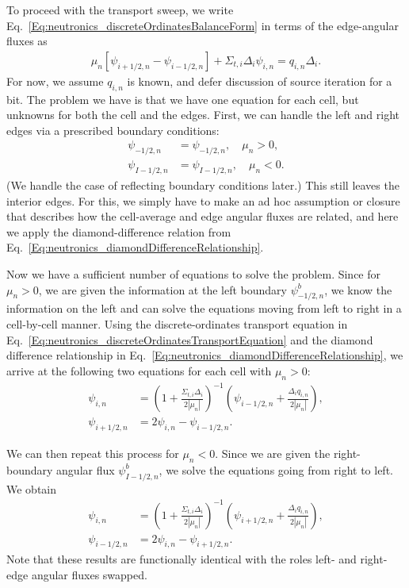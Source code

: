 To proceed with the transport sweep, we write Eq.~\eqref{Eq:neutronics_discreteOrdinatesBalanceForm} in terms of the edge-angular fluxes as
\begin{align}
  \mu_n \left[ \psi_{i+1/2,n} - \psi_{i-1/2,n} \right] + \Sigma_{t,i} \Delta_i \psi_{i,n} = q_{i,n} \Delta_i . \label{Eq:neutronics_discreteOrdinatesTransportEquation}
\end{align}
For now, we assume $q_{i,n}$ is known, and defer discussion of source iteration for a bit. The problem we have is that we have one equation for each cell, but unknowns for both the cell and the edges. First, we can handle the left and right edges via a prescribed boundary conditions:
\begin{subequations}
\begin{align}
  \psi_{-1/2,n}  &= \psi_{-1/2,n},  \quad \mu_n > 0, \\
  \psi_{I-1/2,n} &= \psi_{I-1/2,n}, \quad \mu_n < 0.  
\end{align}
\end{subequations}
(We handle the case of reflecting boundary conditions later.) This still leaves the interior edges. For this, we simply have to make an ad hoc assumption or closure that describes how the cell-average and edge angular fluxes are related, and here we apply the diamond-difference relation from Eq.~\eqref{Eq:neutronics_diamondDifferenceRelationship}.

Now we have a sufficient number of equations to solve the problem. Since for $\mu_n > 0$, we are given the information at the left boundary $\psi_{-1/2,n}^b$, we know the information on the left and can solve the equations moving from left to right in a cell-by-cell manner. Using the discrete-ordinates transport equation in Eq.~\eqref{Eq:neutronics_discreteOrdinatesTransportEquation} and the diamond difference relationship in Eq.~\eqref{Eq:neutronics_diamondDifferenceRelationship}, we arrive at the following two equations for each cell with $\mu_n > 0$:
\begin{subequations}
\begin{align}
  \psi_{i,n} &= \left( 1 + \frac{\Sigma_{t,i} \Delta_i}{ 2 | \mu_n | } \right)^{-1} \left( \psi_{i-1/2,n} + \frac{ \Delta_i q_{i,n} }{ 2 | \mu_n | } \right) , \\
  \psi_{i+1/2,n} &= 2 \psi_{i,n} - \psi_{i-1/2,n} .
\end{align}
\end{subequations}

We can then repeat this process for $\mu_n < 0$. Since we are given the right-boundary angular flux $\psi_{I-1/2,n}^b$, we solve the equations going from right to left. We obtain
\begin{subequations}
\begin{align}
  \psi_{i,n} &= \left( 1 + \frac{\Sigma_{t,i} \Delta_i}{ 2 | \mu_n | } \right)^{-1} \left( \psi_{i+1/2,n} + \frac{ \Delta_i q_{i,n} }{ 2 | \mu_n | } \right) , \\
  \psi_{i-1/2,n} &= 2 \psi_{i,n} - \psi_{i+1/2,n} .
\end{align}
\end{subequations}
Note that these results are functionally identical with the roles left- and right-edge angular fluxes swapped.

